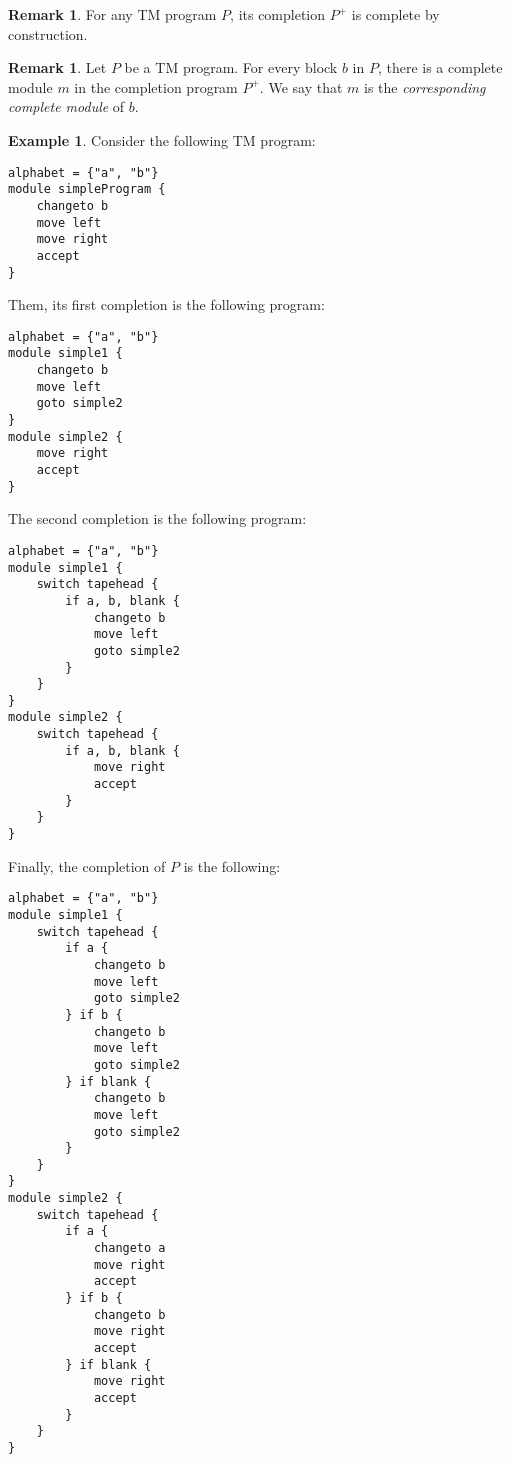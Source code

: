 \documentclass{amsart}
\theoremstyle{definition}
\newtheorem{remark}[theorem]{Remark}
\newtheorem{example}[theorem]{Example}
\begin{document}
    \begin{remark}
        For any TM program $P$, its completion $P^+$ is complete by construction.
    \end{remark}

    \begin{remark}
        Let $P$ be a TM program. For every block $b$ in $P$, there is a complete module $m$ in the completion program $P^+$. We say that $m$ is the \emph{corresponding complete module} of $b$.
    \end{remark}
    
    \begin{example}
        Consider the following TM program:
\begin{lstlisting}[language=TML]
alphabet = {"a", "b"}
module simpleProgram {
    changeto b
    move left
    move right
    accept
}
\end{lstlisting}
\noindent Them, its first completion is the following program:
\begin{lstlisting}[language=TML]
alphabet = {"a", "b"}
module simple1 {
    changeto b
    move left
    goto simple2
}
module simple2 {
    move right
    accept
}
\end{lstlisting}
\noindent The second completion is the following program:
\begin{lstlisting}[language=TML]
alphabet = {"a", "b"}
module simple1 {
    switch tapehead {
        if a, b, blank {
            changeto b
            move left
            goto simple2
        }
    }
}
module simple2 {
    switch tapehead {
        if a, b, blank {
            move right
            accept
        }
    }
}
\end{lstlisting}
\noindent Finally, the completion of $P$ is the following:
\begin{lstlisting}[language=TML]
alphabet = {"a", "b"}
module simple1 {
    switch tapehead {
        if a {
            changeto b
            move left
            goto simple2
        } if b {
            changeto b
            move left
            goto simple2
        } if blank {
            changeto b
            move left
            goto simple2
        }
    }
}
module simple2 {
    switch tapehead {
        if a {
            changeto a
            move right
            accept
        } if b {
            changeto b
            move right
            accept
        } if blank {
            move right
            accept
        }
    }
}
\end{lstlisting}
    \end{example}
\end{document}

